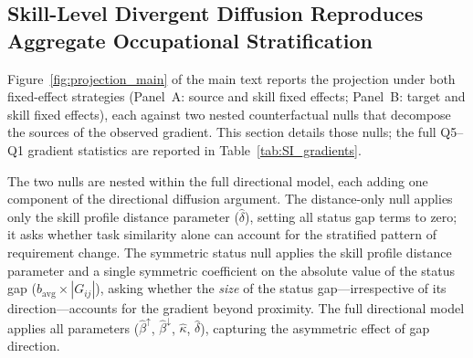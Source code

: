\documentclass[11pt, letterpaper]{article} %
\begin{document}
\subsection{Skill-Level Divergent Diffusion Reproduces Aggregate Occupational Stratification}
\label{sec:SI_projections}
 
Figure~\ref{fig:projection_main} of the main text reports the projection under both fixed-effect strategies (Panel~A: source and skill fixed effects; Panel~B: target and skill fixed effects), each against two nested counterfactual nulls that decompose the sources of the observed gradient. This section details those nulls; the full Q5--Q1 gradient statistics are reported in Table~\ref{tab:SI_gradients}.
 
The two nulls are nested within the full directional model, each adding one component of the directional diffusion argument. The distance-only null applies only the skill profile distance parameter ($\hat{\delta}$), setting all status gap terms to zero; it asks whether task similarity alone can account for the stratified pattern of requirement change. The symmetric status null applies the skill profile distance parameter and a single symmetric coefficient on the absolute value of the status gap ($b_{\mathrm{avg}} \times |G_{ij}|$), asking whether the \textit{size} of the status gap---irrespective of its direction---accounts for the gradient beyond proximity. The full directional model applies all parameters ($\hat{\beta}^{\uparrow}$, $\hat{\beta}^{\downarrow}$, $\hat{\kappa}$, $\hat{\delta}$), capturing the asymmetric effect of gap direction.
 
\end{document}
